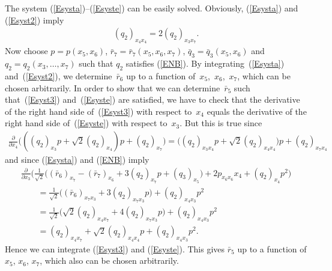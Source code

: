 \documentclass[11pt]{article}
\numberwithin{equation}{section}
\begin{document}
\begin{Remark} \label{34}The system (\ref{Esysta})--(\ref{Esyste}) can be easily solved. Obviously, (\ref{Esysta}) and (\ref{Esyst2}) imply
\begin{gather}
(q_2)_{x_4 x_4} =2 (q_2)_{x_3 x_7}. \label{ENB}
\end{gather}
Now choose $p=p(x_5,x_6)$, $\bar r_7=\bar r_7(x_5,x_6,x_7)$, $\bar q_3=\bar q_3(x_5,x_6)$ and $q_2=q_2(x_3,\dots,x_7)$ such that $q_2$ satisfies (\ref{ENB}). By integrating~(\ref{Esysta}) and~(\ref{Esyst2}), we determine~$\bar r_6$ up to a function of~$x_5$,~$x_6$,~$x_7$, which can be chosen arbitrarily. In order to show that we can determine~$\bar r_5$ such that~(\ref{Esyst3}) and~(\ref{Esyste}) are satisfied, we have to check that the derivative of the right hand side of~(\ref{Esyst3}) with respect to~$x_4$ equals the derivative of the right hand side of~(\ref{Esyste}) with respect to~$x_3$. But this is true since
\begin{gather*} \frac{\partial}{\partial x_4} \big(((q_2)_{x_3}p+ {\sqrt2}(q_2)_{x_4})p+ (q_2)_{x_7}\big)=\big((q_2)_{x_3x_4}p+ {\sqrt2}(q_2)_{x_4x_4}\big)p+ (q_2)_{x_7x_4}\end{gather*}
and since (\ref{Esysta}) and (\ref{ENB}) imply
\begin{gather*}
 \frac{\partial}{\partial x_3}\big(\tfrac 1{\sqrt2} \big((\bar r_6)_{x_7} - (\bar r_7)_{x_6} +3 (q_2)_{x_7}p +(q_3)_{x_5}\big) +2p_{x_6 x_6} x_4 +(q_2)_{x_4} p^2\big) \\
 \qquad{} = \tfrac 1{\sqrt2}\big((\bar r_6)_{x_7x_3} +3 (q_2)_{x_7x_3}p\big) +(q_2)_{x_4x_3} p^2\\
\qquad{} = \tfrac 1{\sqrt2}\big(\sqrt2(q_2)_{x_4x_7} +4 (q_2)_{x_7x_3}p\big) +(q_2)_{x_4x_3} p^2\\
\qquad{} = (q_2)_{x_4x_7} +\sqrt2 (q_2)_{x_4x_4}p +(q_2)_{x_4x_3} p^2.
\end{gather*}
Hence we can integrate (\ref{Esyst3}) and (\ref{Esyste}). This gives $\bar r_5$ up to a function of $x_5$, $x_6$, $x_7$, which also can be chosen arbitrarily.
\end{Remark}
\end{document}
